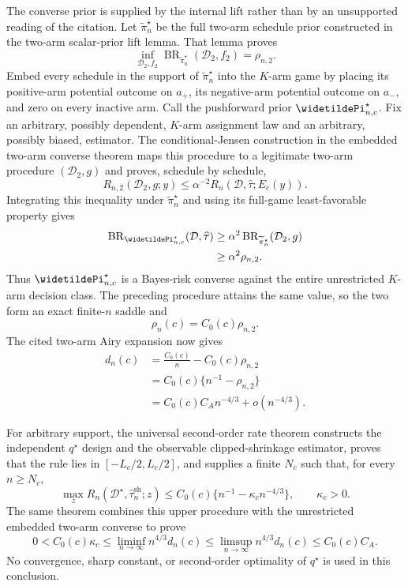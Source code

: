 The converse prior is supplied by the internal lift rather than by an unsupported reading of the citation. Let \(\widetilde\pi_n^\star\) be the full two-arm schedule prior constructed in the two-arm scalar-prior lift lemma. That lemma proves
\[
 \inf_{\mathcal D_2,f_2}
 \operatorname{BR}_{\widetilde\pi_n^\star}(\mathcal D_2,f_2)
 =\rho_{n,2}.
\]
Embed every schedule in the support of \(\widetilde\pi_n^\star\) into the \(K\)-arm game by placing its positive-arm potential outcome on \(a_+\), its negative-arm potential outcome on \(a_-\), and zero on every inactive arm. Call the pushforward prior \(\widetildePi_{n,c}^\star\). Fix an arbitrary, possibly dependent, \(K\)-arm assignment law and an arbitrary, possibly biased, estimator. The conditional-Jensen construction in the embedded two-arm converse theorem maps this procedure to a legitimate two-arm procedure \((\mathcal D_2,g)\) and proves, schedule by schedule,
\[
 R_{n,2}(\mathcal D_2,g;y)
 \leq \alpha^{-2}R_n(\mathcal D,\widehat\tau;E_c(y)).
\]
Integrating this inequality under \(\widetilde\pi_n^\star\) and using its full-game least-favorable property gives
\[
 \begin{aligned}
 \operatorname{BR}_{\widetildePi_{n,c}^\star}(\mathcal D,\widehat\tau)
 &\geq \alpha^2
 \operatorname{BR}_{\widetilde\pi_n^\star}(\mathcal D_2,g)\\
 &\geq \alpha^2\rho_{n,2}.
 \end{aligned}
\]
Thus \(\widetildePi_{n,c}^\star\) is a Bayes-risk converse against the entire unrestricted \(K\)-arm decision class. The preceding procedure attains the same value, so the two form an exact finite-\(n\) saddle and
\[
 \rho_n(c)=C_0(c)\rho_{n,2}.
\]
The cited two-arm Airy expansion now gives
\[
 \begin{aligned}
 d_n(c)
 &=\frac{C_0(c)}n-C_0(c)\rho_{n,2}\\
 &=C_0(c)\{n^{-1}-\rho_{n,2}\}\\
 &=C_0(c)C_A n^{-4/3}+o(n^{-4/3}).
 \end{aligned}
\]

For arbitrary support, the universal second-order rate theorem constructs the independent \(q^\star\) design and the observable clipped-shrinkage estimator, proves that the rule lies in \([-L_c/2,L_c/2]\), and supplies a finite \(N_c\) such that, for every \(n\geq N_c\),
\[
 \max_zR_n(\mathcal D^\star,\widehat\tau_n^{\mathrm{sh}};z)
 \leq C_0(c)\{n^{-1}-\kappa_cn^{-4/3}\},
 \qquad \kappa_c>0.
\]
The same theorem combines this upper procedure with the unrestricted embedded two-arm converse to prove
\[
 0<C_0(c)\kappa_c
 \leq\liminf_{n\to\infty}n^{4/3}d_n(c)
 \leq\limsup_{n\to\infty}n^{4/3}d_n(c)
 \leq C_0(c)C_A.
\]
No convergence, sharp constant, or second-order optimality of \(q^\star\) is used in this conclusion.

